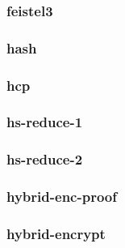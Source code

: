 \begin{frame}\frametitle{feistel3}
\begin{figure}
\begin{center}

\end{center}
\end{figure}
\end{frame}
\begin{frame}\frametitle{hash}
\begin{figure}
\begin{center}

\end{center}
\end{figure}
\end{frame}
\begin{frame}\frametitle{hcp}
\begin{figure}
\begin{center}

\end{center}
\end{figure}
\end{frame}
\begin{frame}\frametitle{hs-reduce-1}
\begin{figure}
\begin{center}

\end{center}
\end{figure}
\end{frame}
\begin{frame}\frametitle{hs-reduce-2}
\begin{figure}
\begin{center}

\end{center}
\end{figure}
\end{frame}
\begin{frame}\frametitle{hybrid-enc-proof}
\begin{figure}
\begin{center}

\end{center}
\end{figure}
\end{frame}
\begin{frame}\frametitle{hybrid-encrypt}
\begin{figure}
\begin{center}

\end{center}
\end{figure}
\end{frame}
